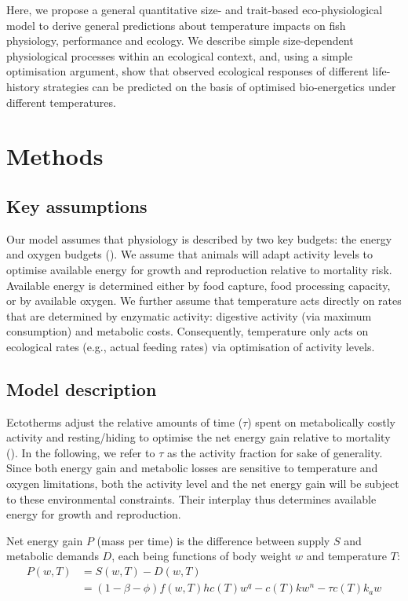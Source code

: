 \documentclass[11pt]{article}\usepackage[]{graphicx}\usepackage[]{color,soul}
\begin{document}
Here, we propose a general quantitative size- and trait-based eco-physiological model to derive general predictions about temperature impacts on fish  physiology, performance and ecology. We describe simple size-dependent physiological processes within an ecological context, and, using a simple optimisation argument, show that observed ecological responses of different life-history strategies can be predicted on the basis of optimised bio-energetics under different temperatures.

\section*{Methods}

\subsection*{Key assumptions}

Our model assumes that physiology is described by two key budgets: the energy and oxygen budgets (\citealt{holt_climate_2015,holt_climate_2014}). We assume that animals will adapt activity levels to optimise available energy for growth and reproduction relative to mortality risk. Available energy is determined either by food capture, food processing capacity, or by available oxygen. We further assume that temperature acts directly on rates that are determined by enzymatic activity: digestive activity (via maximum consumption) and metabolic costs. Consequently, temperature only acts on ecological rates (e.g., actual feeding rates) via optimisation of activity levels.

\subsection*{Model description}
Ectotherms adjust the relative amounts of time ($\tau$) spent on metabolically costly activity and resting/hiding to optimise the net energy gain relative to mortality (\citealt{gilliam_habitat_1987}). In the following, we refer to $\tau$ as the activity fraction for sake of generality.   Since both energy gain and metabolic losses are sensitive to temperature and oxygen limitations, both the activity level and the net energy gain will be subject to these environmental constraints. Their interplay thus determines available energy for growth and reproduction.

Net energy gain $P$ (mass per time) is the difference between supply $S$ and metabolic demands $D$, each being functions of body weight $w$ and temperature $T$:
\begin{align}
P(w,T) &= S(w,T) - D(w,T) \\
          &=(1-\beta-\phi)f(w,T) h c(T) w^q  - c(T) k w^n - \tau c(T) k_a w
  \label{eq:P}
\end{align}
\end{document}
